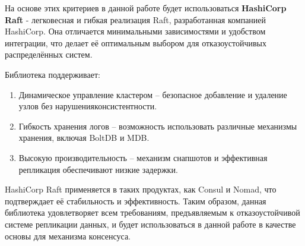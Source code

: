 На основе этих критериев в данной работе будет использоваться \textbf{HashiCorp Raft} -
легковесная и гибкая реализация Raft, разработанная компанией HashiCorp. Она отличается
минимальными зависимостями и удобством интеграции, что делает её оптимальным выбором для
отказоустойчивых распределённых систем.  

Библиотека поддерживает:

\begin{enumerate}
    \item Динамическое управление кластером – безопасное добавление и удаление узлов
    без нарушенияконсистентности.
    \item Гибкость хранения логов – возможность использовать различные механизмы
    хранения, включая BoltDB и MDB.
    \item Высокую производительность – механизм снапшотов и эффективная репликация
    обеспечивают низкие задержки.
\end{enumerate}

HashiCorp Raft применяется в таких продуктах, как Consul и Nomad, что подтверждает её
стабильность и эффективность. Таким образом, данная библиотека удовлетворяет всем
требованиям, предъявляемым к отказоустойчивой системе репликации данных, и будет
использоваться в данной работе в качестве основы для механизма консенсуса.
